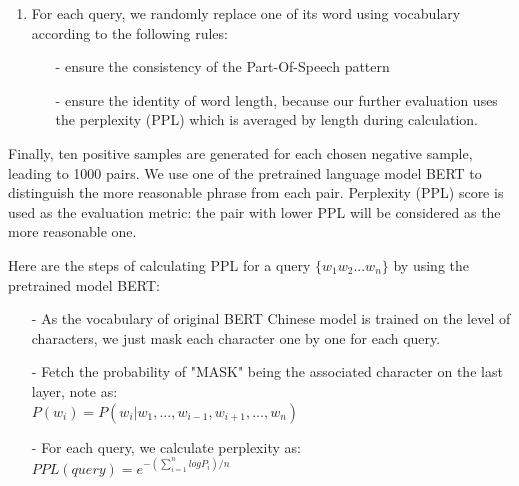 \begin{enumerate}
	\item For each query, we randomly replace one of its word using vocabulary according to the following rules:
	\begin{itemize}
		\item [-] 
		ensure the consistency of the Part-Of-Speech pattern
		\item [-] %
		ensure the identity of word length, because our further evaluation uses the perplexity (PPL) which is averaged by length during calculation. 
	\end{itemize} 
\end{enumerate}

Finally, ten positive samples are generated for each chosen negative sample, leading to 1000 pairs. We use one of the pretrained language model BERT to distinguish the more reasonable phrase from each pair. Perplexity (PPL) score is used as the evaluation metric: the pair with lower PPL will be considered as the more reasonable one.

Here are the steps of calculating PPL for a query $\{w_1 w_2 ... w_n\}$ by using the pretrained model BERT:
\begin{itemize}
	\item [-] As the vocabulary of original BERT Chinese model is trained on the level of characters, we just mask each character one by one for each query.
	\item [-] Fetch the probability of "MASK" being the associated character on the last layer, note as:\\$P(w_i) = P(w_i|w_1,...,w_{i-1},w_{i+1},...,w_n)$
	\item [-] For each query, we calculate perplexity as: \\
	$PPL(query) = e^{-(\sum_{i=1}^{n}logP_{i})/n}$  
\end{itemize}

